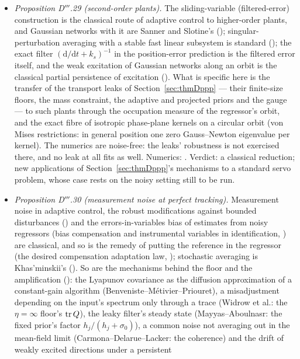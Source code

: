 \begin{itemize}
    mechanism and an exact margin formula for a scalar amplitude.
  \item \emph{Proposition D$'''$.29 (second-order plants).} The sliding-variable (filtered-error) construction is the
    classical route of adaptive control to higher-order plants, and Gaussian networks with it are Sanner and Slotine's
    (\cite{sanner1992}); singular-perturbation averaging with a stable fast linear subsystem is standard
    (\cite{kko1986}); the exact filter $(\mathrm{d}/\mathrm{d}t + k_s)^{-1}$ in the position-error prediction is the
    filtered error itself, and the weak excitation of Gaussian networks along an orbit is the classical partial
    persistence of excitation (\cite{R6,R7,R8}). What is specific here is the transfer of the transport leaks of
    Section~\ref{sec:thmDppp} --- their finite-size floors, the mass constraint, the adaptive and projected priors and
    the gauge --- to such plants through the occupation measure of the regressor's orbit, and the exact fibre of
    isotropic phase-plane kernels on a circular orbit (von Mises restrictions: in general position one zero
    Gauss--Newton eigenvalue per kernel). The numerics are noise-free: the leaks' robustness is not exercised there,
    and no leak at all fits as well. Numerics: . Verdict: a classical reduction; new
    applications of Section~\ref{sec:thmDppp}'s mechanisms to a standard servo problem, whose case rests on the noisy
    setting still to be run.
  \item \emph{Proposition D$'''$.30 (measurement noise at perfect tracking).} Measurement noise in adaptive control,
    the robust modifications against bounded disturbances (\cite{ioannou1996}) and the errors-in-variables bias of
    estimates from noisy regressors (bias compensation and instrumental variables in identification, \cite{S53}) are
    classical, and so is the remedy of putting the reference in the regressor (the desired compensation adaptation
    law, \cite{S53}); stochastic averaging is Khas'minskii's (\cite{S53}). So are the mechanisms behind the floor and
    the amplification (\cite{S57}): the Lyapunov covariance as the diffusion approximation of a constant-gain
    algorithm (Benveniste--M\'etivier--Priouret), a misadjustment depending on the input's spectrum only through a
    trace (Widrow et al.: the $\eta = \infty$ floor's $\operatorname{tr} Q$), the leaky filter's steady state (Mayyas--Aboulnasr:
    the fixed prior's factor $h_j/(h_j + \sigma_0)$), a common noise not averaging out in the mean-field limit
    (Carmona--Delarue--Lacker: the coherence) and the drift of weakly excited directions under a persistent

\end{itemize}
